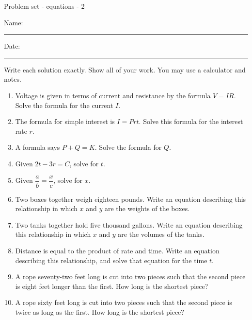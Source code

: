 \documentclass[12pt]{article}
\begin{document}
\pagestyle{empty} %
\begin{center}
          Problem set - equations - 2 \\[0.5in]
\end{center}
Name: \rule{4in}{0.005in} Date: \rule{1.5in}{0.005in} 
  \vspace{0.25in}

Write each solution exactly. Show all of your work. You may use a calculator and notes. 
\begin{enumerate}
\newcommand{\spacing}{\vspace{0.50in}}

\item Voltage is given in terms of current and resistance by the formula $V=IR$. Solve the formula for the current $I$. 
	\spacing

\item The formula for simple interest is $I=Prt$. Solve this formula for the interest rate $r$. 
	\spacing

\item A formula says $P+Q=K$. Solve the formula for $Q$. 
	\spacing

\item Given $2t-3r=C$, solve for $t$. 
	\spacing

\item Given $\dfrac{a}{b}=\dfrac{x}{c}$, solve for $x$. 
	\spacing

\item Two boxes together weigh eighteen pounds. Write an equation describing this relationship in which $x$ and $y$ are the weights of the boxes. 
	\spacing

\item Two tanks together hold five thousand gallons. Write an equation describing this relationship in which $x$ and $y$ are the volumes of the tanks. 
	\spacing

\item Distance is equal to the product of rate and time. Write an equation describing this relationship, and solve that equation for the time $t$. 
	\spacing

\item A rope seventy-two feet long is cut into two pieces such that the second piece is eight feet longer than the first. How long is the shortest piece?
	\spacing

\item A rope sixty feet long is cut into two pieces such that the second piece is twice as long as the first. How long is the shortest piece?
	\spacing


\end{enumerate}
\end{document}
